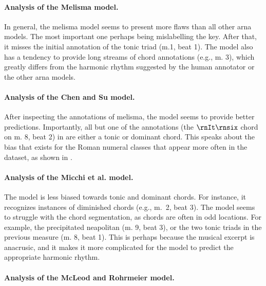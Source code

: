 \paragraph{Analysis of the Melisma model.}

In general, the \gls{melisma} model seems to present more
flaws than all other \gls{arna} models. The most important
one perhaps being mislabelling the key. After that, it
misses the initial annotation of the tonic triad (m.1, beat
1). The model also has a tendency to provide long streams of
chord annotations (e.g., m. 3), which greatly differs from
the harmonic rhythm suggested by the human annotator or the
other \gls{arna} models. 

\paragraph{Analysis of the Chen and Su model.}

After inspecting the annotations of \gls{melisma}, the
\textcite{chen2021attend} model seems to provide better
predictions. Importantly, all but one of the annotations
(the $\rnIt\rnsix$ chord on m. 8, beat 2) in
\textcite{chen2021attend} are either a tonic or dominant
chord. This speaks about the bias that exists for the Roman
numeral classes that appear more often in the dataset, as
shown in . 

\paragraph{Analysis of the Micchi et al. model.}

The \textcite{micchi2021deep} model is less biased towards
tonic and dominant chords. For instance, it recognizes
instances of diminished chords (e.g., m.~2, beat 3). The
model seems to struggle with the chord segmentation, as
chords are often in odd locations. For example, the
precipitated \gls{neapolitan} (m. 9, beat 3), or the two
tonic triads in the previous measure (m. 8, beat 1). This is
perhaps because the musical excerpt is anacrusic, and it
makes it more complicated for the model to predict the
appropriate harmonic rhythm. 

\paragraph{Analysis of the McLeod and Rohrmeier model.}

